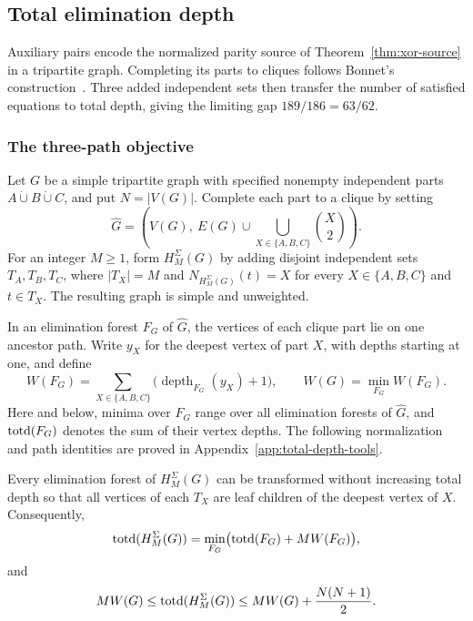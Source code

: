 \subsection{Total elimination depth}
\label{subsec:np-total-depth}

Auxiliary pairs encode the normalized parity source of
Theorem~\ref{thm:xor-source} in a tripartite graph. Completing its parts
to cliques follows Bonnet's construction~\cite[Section~3.1]{BonnetTreewidth}.
Three added independent sets then transfer the number of satisfied
equations to total depth, giving the limiting gap ${189/186=63/62}$.

\subsubsection{The three-path objective}

Let $G$ be a simple tripartite graph with specified nonempty independent
parts $A\mathbin{\dot\cup}B\mathbin{\dot\cup}C$, and put $N=|V(G)|$.
Complete each part to a clique by setting
\[
 \widehat G=\left(V(G),\ E(G)\cup
                 \bigcup_{X\in\{A,B,C\}}\binom{X}{2}\right).
\]
For an integer $M\geq1$, form $H^\Sigma_M(G)$ by adding disjoint
independent sets $T_A,T_B,T_C$, where $|T_X|=M$ and
$N_{H^\Sigma_M(G)}(t)=X$ for every $X\in\{A,B,C\}$ and $t\in T_X$.
The resulting graph is simple and unweighted.

In an elimination forest $F_G$ of $\widehat G$, the vertices of each
clique part lie on one ancestor path. Write $y_X$ for the deepest vertex
of part $X$, with depths starting at one, and define
\[
 W(F_G)=\sum_{X\in\{A,B,C\}}
          \bigl(\operatorname{depth}_{F_G}(y_X)+1\bigr),
 \qquad W(G)=\min_{F_G}W(F_G).
\]
Here and below, minima over $F_G$ range over all elimination forests
of $\widehat G$, and $\operatorname{totd}(F_G)$ denotes the sum of their vertex depths.
The following normalization and path identities are proved in
Appendix~\ref{app:total-depth-tools}.

\begin{lemma}
\label{lem:np-total-depth-added-vertices}
Every elimination forest of $H^\Sigma_M(G)$ can be transformed without
increasing total depth so that all vertices of each $T_X$ are leaf
children of the deepest vertex of $X$. Consequently,
\begin{equation}\label{eq:np-total-depth-added-vertices-identity}
 \operatorname{totd}(H^\Sigma_M(G))
 =\min_{F_G}\bigl(\operatorname{totd}(F_G)+MW(F_G)\bigr),
\end{equation}
and
\begin{equation}\label{eq:np-total-depth-added-vertices-bounds}
 MW(G)
 \leq\operatorname{totd}(H^\Sigma_M(G))
 \leq MW(G)+\frac{N(N+1)}2.
\end{equation}
\end{lemma}

